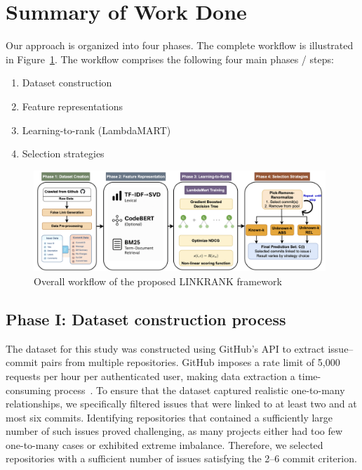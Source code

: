 \section{Summary of Work Done}


Our approach is organized into four phases. The complete workflow is illustrated in Figure~\ref{fig:approach}. The workflow comprises the following four main phases / steps:
\begin{enumerate}
    \setlength{\itemsep}{2pt}
    \setlength{\parskip}{0pt}
    \item Dataset construction
    \item Feature representations
    \item Learning-to-rank (LambdaMART)
    \item Selection strategies
\end{enumerate}

\begin{figure}[h!]
    \centering
    \includegraphics[width=0.98\textwidth]{figures/App.png}
    \caption{Overall workflow of the proposed LINKRANK framework}
    \label{fig:approach}
\end{figure}




\subsection{Phase I: Dataset construction process}


The dataset for this study was constructed using GitHub’s API to extract issue--commit pairs from multiple repositories. GitHub imposes a rate limit of 5,000 requests per hour per authenticated user, making data extraction a time-consuming process~\cite{GitHubAPI}. To ensure that the dataset captured realistic one-to-many relationships, we specifically filtered issues that were linked to at least two and at most six commits. Identifying repositories that contained a sufficiently large number of such issues proved challenging, as many projects either had too few one-to-many cases or exhibited extreme imbalance. Therefore, we selected repositories with a sufficient number of issues satisfying the 2–6 commit criterion. 

